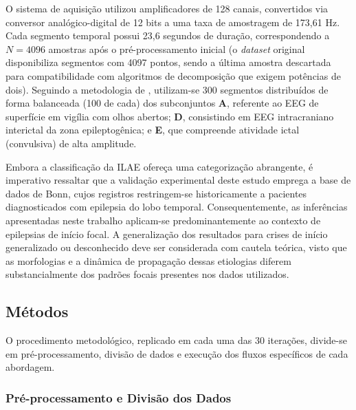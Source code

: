 \documentclass[alpha-refs,brazilian]{CC-EC_TF-TC}
\begin{document}
O sistema de aquisição utilizou amplificadores de 128 canais, convertidos via conversor analógico-digital de 12 bits a uma taxa de amostragem de 173,61 Hz. Cada segmento temporal possui 23,6 segundos de duração, correspondendo a $N=4096$ amostras após o pré-processamento inicial (o \textit{dataset} original disponibiliza segmentos com 4097 pontos, sendo a última amostra descartada para compatibilidade com algoritmos de decomposição que exigem potências de dois). Seguindo a metodologia de \cite{Yogarajan2023}, utilizam-se 300 segmentos distribuídos de forma balanceada (100 de cada) dos subconjuntos \textbf{A}, referente ao EEG de superfície em vigília com olhos abertos; \textbf{D}, consistindo em EEG intracraniano interictal da zona epileptogênica; e \textbf{E}, que compreende atividade ictal (convulsiva) de alta amplitude.

Embora a classificação da ILAE \citep{Beniczky2025} ofereça uma categorização abrangente, é imperativo ressaltar que a validação experimental deste estudo emprega a base de dados de Bonn, cujos registros restringem-se historicamente a pacientes diagnosticados com epilepsia do lobo temporal. Consequentemente, as inferências apresentadas neste trabalho aplicam-se predominantemente ao contexto de epilepsias de início focal. A generalização dos resultados para crises de início generalizado ou desconhecido deve ser considerada com cautela teórica, visto que as morfologias e a dinâmica de propagação dessas etiologias diferem substancialmente dos padrões focais presentes nos dados utilizados.

\subsection{Métodos}

O procedimento metodológico, replicado em cada uma das 30 iterações, divide-se em pré-processamento, divisão de dados e execução dos fluxos específicos de cada abordagem.

\subsubsection{Pré-processamento e Divisão dos Dados}
\end{document}
